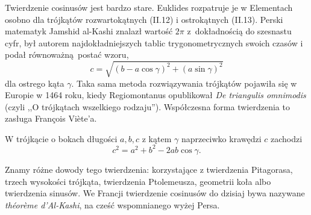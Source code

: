 Twierdzenie cosinusów jest bardzo stare.
Euklides rozpatruje je w Elementach osobno dla trójkątów rozwartokątnych (II.12) i ostrokątnych (II.13).
Perski matematyk Jamshid al-Kashi znalazł wartość $2\pi$ z~dokładnością do szesnastu cyfr, był autorem najdokładniejszych tablic trygonometrycznych swoich czasów i podał równoważną postać wzoru,
\begin{equation}
	c = \sqrt{(b - a \cos \gamma)^2 + (a \sin \gamma)^2}
\end{equation}
dla ostrego kąta $\gamma$.
Taka sama metoda rozwiązywania trójkątów pojawiła się w Europie w 1464 roku, kiedy Regiomontanus opublikował \emph{De triangulis omnimodis} (czyli ,,O trójkątach wszelkiego rodzaju'').
%
Współczesna forma twierdzenia to zasługa François Viète'a.
%

\begin{proposition}
	W trójkącie o bokach długości $a, b, c$ z kątem $\gamma$ naprzeciwko krawędzi $c$ zachodzi
	\label{twierdzenie_cosinusow}%
	\begin{equation}
		c^2 = a^2 + b^2 - 2ab \cos \gamma.
	\end{equation}
\end{proposition}

Znamy różne dowody tego twierdzenia: korzystające z twierdzenia Pitagorasa, trzech wysokości trójkąta, twierdzenia Ptolemeusza, geometrii koła albo twierdzenia sinusów.
We Francji twierdzenie cosinusów do dzisiaj bywa nazywane \emph{théorème d'Al-Kashi}, na cześć wspomnianego wyżej Persa.


